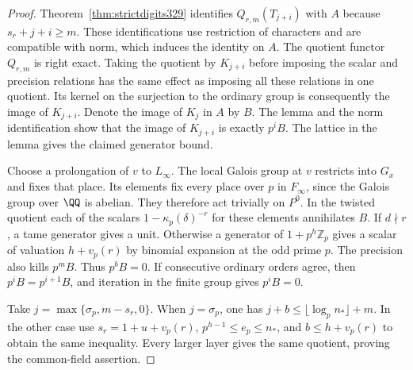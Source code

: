 \documentclass[a4paper,11pt]{article}
\theoremstyle{definition}
\theoremstyle{remark}
\newcommand{\ZZ}{\mathbb Z}\newcommand{\ord}{\operatorname{ord}}
\numberwithin{equation}{section}
\begin{document}
\begin{proof}
Theorem~\ref{thm:strictdigits329} identifies \(Q_{r,m}(T_{j+i})\)
with \(A\) because \(s_r+j+i\ge m\). These identifications use
restriction of characters and are compatible with norm, which
induces the identity on \(A\). The quotient functor \(Q_{r,m}\)
is right exact. Taking the quotient by \(K_{j+i}\) before imposing
the scalar and precision relations has the same effect as imposing
all these relations in one quotient. Its kernel on the surjection
to the ordinary group is consequently the image of \(K_{j+i}\).
Denote the image of \(K_j\) in \(A\) by \(B\). The lemma and the
norm identification show that the image of \(K_{j+i}\) is exactly
\(p^i B\). The lattice in the lemma gives the claimed generator bound.

Choose a prolongation of \(v\) to \(L_\infty\). The local Galois
group at \(v\) restricts into \(G_x\) and fixes that place. Its
elements fix every place over \(p\) in \(F_\infty\), since the
Galois group over \(\QQ\) is abelian. They therefore act trivially
on \(P^0\). In the twisted quotient each of the scalars
\(1-\kappa_p(\delta)^{-r}\) for these elements annihilates \(B\).
If \(d\nmid r\), a tame generator gives a unit. Otherwise a generator
of \(1+p^h\ZZ_p\) gives a scalar of valuation \(h+v_p(r)\) by
binomial expansion at the odd prime \(p\). The precision also kills
\(p^m B\). Thus \(p^bB=0\). If consecutive ordinary orders agree,
then \(p^iB=p^{i+1}B\), and iteration in the finite group gives \(p^iB=0\).

Take \(j=\max\{\sigma_p,m-s_r,0\}\). When \(j=\sigma_p\), one has
\(j+b\le\lfloor\log_p n_*\rfloor+m\). In the other case use
\(s_r=1+u+v_p(r)\), \(p^{h-1}\le e_p\le n_*\), and
\(b\le h+v_p(r)\) to obtain the same inequality. Every larger
layer gives the same quotient, proving the common-field assertion.
\end{proof}
\end{document}
